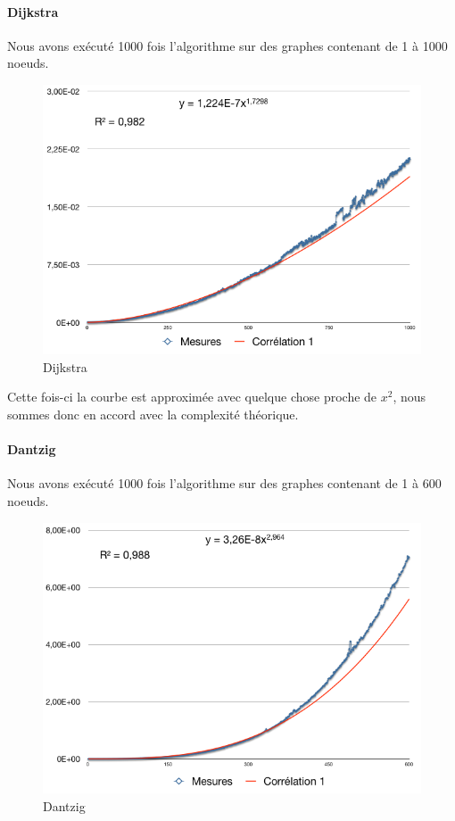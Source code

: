 \documentclass[a4paper,12pt,final] {article}
\begin{document}
\paragraph{Dijkstra}
Nous avons exécuté 1000 fois l'algorithme sur des graphes contenant de 1 à 1000 noeuds.

\begin{figure}[H]
\begin{center}
\includegraphics[scale=0.4]{dijkstra}
\end{center}
\caption{Dijkstra}
\end{figure}

Cette fois-ci la courbe est approximée avec quelque chose proche de $x^{2}$, nous sommes donc en accord avec la complexité théorique.
\paragraph{Dantzig}
Nous avons exécuté 1000 fois l'algorithme sur des graphes contenant de 1 à 600 noeuds.

\begin{figure}[H]
\begin{center}
\includegraphics[scale=0.4]{dantzig}
\end{center}
\caption{Dantzig}
\end{figure}
\end{document}
